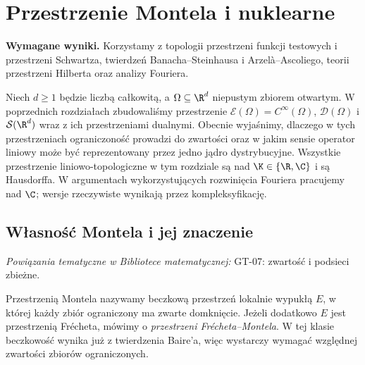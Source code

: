 \setcounter{section}{7}
\section{Przestrzenie Montela i nuklearne}
\label{sec:montel-nuklearne23}

\providecommand{\atlasref}[2]{#2}


\noindent\textbf{Wymagane wyniki.} Korzystamy z topologii
przestrzeni funkcji testowych i przestrzeni Schwartza,
twierdzeń Banacha--Steinhausa i Arzelà--Ascoliego,
teorii przestrzeni Hilberta oraz analizy Fouriera.
\medskip

Niech $d\ge1$ będzie liczbą całkowitą, a $\Omega\subseteq\R^d$
niepustym zbiorem otwartym. W poprzednich rozdziałach
zbudowaliśmy przestrzenie
$\mathcal E(\Omega)=C^\infty(\Omega)$,
$\mathcal D(\Omega)$ i $\mathcal S(\R^d)$ wraz z ich
przestrzeniami dualnymi. Obecnie wyjaśnimy, dlaczego w tych
przestrzeniach ograniczoność prowadzi do zwartości oraz w jakim
sensie operator liniowy może być reprezentowany przez jedno jądro
dystrybucyjne. Wszystkie przestrzenie liniowo-topologiczne w tym
rozdziale są nad $\K\in\{\R,\C\}$ i są Hausdorffa. W argumentach
wykorzystujących rozwinięcia Fouriera pracujemy nad $\C$;
wersje rzeczywiste wynikają przez kompleksyfikację.

\subsection{Własność Montela i jej znaczenie}

\noindent\emph{Powiązania tematyczne w Bibliotece matematycznej:} \atlasref{GT-07::thm:topog-zwartosc-sieci}{GT-07: zwartość i podsieci zbieżne}.


\begin{definicja}
\label{def:montel23}
Przestrzenią Montela nazywamy beczkową przestrzeń lokalnie wypukłą
$E$, w której każdy zbiór ograniczony ma zwarte domknięcie.
Jeżeli dodatkowo $E$ jest przestrzenią Frécheta, mówimy o
\emph{przestrzeni Frécheta--Montela}. W tej klasie beczkowość
wynika już z twierdzenia Baire'a, więc wystarczy wymagać
względnej zwartości zbiorów ograniczonych.
\end{definicja}

